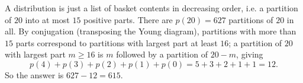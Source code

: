 A distribution is just a list of basket contents in decreasing order, i.e. a partition of $20$ into at most $15$ positive parts. There are $p(20)=627$ partitions of $20$ in all. By conjugation (transposing the Young diagram), partitions with more than $15$ parts correspond to partitions with largest part at least $16$; a partition of $20$ with largest part $m\ge16$ is $m$ followed by a partition of $20-m$, giving
\[
p(4)+p(3)+p(2)+p(1)+p(0)=5+3+2+1+1=12 .
\]
So the answer is $627-12=\boxed{615}$.
